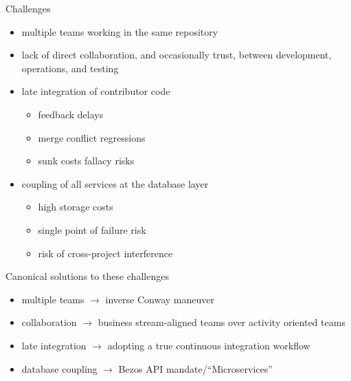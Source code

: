 \documentclass{beamer}
\begin{document}
	\begin{frame}{Challenges}
		\begin{itemize}
			\item multiple teams working in the same repository \pause
			\item lack of direct collaboration, and occasionally trust, between development, operations, and testing \pause
			\item late integration of contributor code \pause
			\begin{itemize}
				\item feedback delays \pause
				\item merge conflict regressions \pause
				\item sunk costs fallacy risks \pause
			\end{itemize}
			\item coupling of all services at the database layer \pause
			\begin{itemize}
				\item high storage costs \pause
				\item single point of failure risk \pause
				\item risk of cross-project interference \pause
			\end{itemize}
		\end{itemize}
	\end{frame}
	\begin{frame}{Canonical solutions to these challenges}
		\begin{itemize}
			\item multiple teams $\rightarrow$ inverse Conway maneuver \pause
			\item collaboration $\rightarrow$ business stream-aligned teams over activity oriented teams \pause
			\item late integration $\rightarrow$ adopting a true continuous integration workflow \pause
			\item database coupling $\rightarrow$ Bezos API mandate/``Microservices'' \pause		
		\end{itemize}
	\end{frame}
\end{document}
